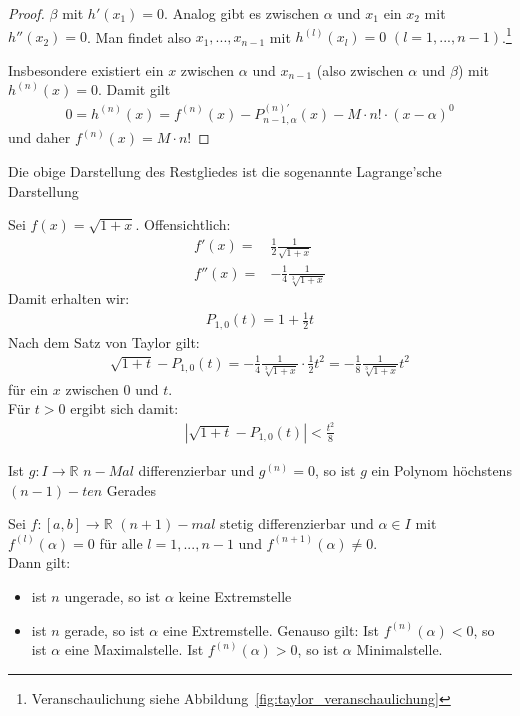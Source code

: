 \begin{proof}
	$\beta$ mit $h'(x_1) = 0$. Analog gibt es zwischen $\alpha$ und 
	$x_1$ ein $x_2$ mit $h''(x_2) = 0$. Man findet also $x_1, ..., x_{n-1}$ mit 
	$h^{(l)}(x_l) = 0$ $( l = 1, ..., n-1)$.\footnote{Veranschaulichung siehe Abbildung~\ref{fig:taylor_veranschaulichung}}

	Insbesondere existiert ein $x$ 
	zwischen $\alpha$ und $x_{n-1}$ (also zwischen $\alpha$ und $\beta$) mit 
	$h^{(n)}(x) = 0$. Damit gilt 
	\begin{align*}
		0 = h^{(n)}(x) = f^{(n)}(x) - P^{(n)'}_{n-1, \alpha}(x) - M \cdot n! \cdot 
		(x-\alpha)^0
	\end{align*}{}
	und daher $f^{(n)}(x) = M \cdot n!$
\end{proof}	

\begin{Bemerkung}{
	Die obige Darstellung des Restgliedes ist die sogenannte 
	Lagrange'sche Darstellung
}\end{Bemerkung}


\begin{Beispiel}{
	Sei $f(x) = \sqrt{1 +x}$. Offensichtlich: 
	\begin{align*}
		f'(x) = & \frac{1}{2} \frac{1}{\sqrt{1+x}} \\
		f''(x) = & -\frac{1}{4} \frac{1}{\sqrt[3]{1+x}}
	\end{align*}
	Damit erhalten wir: 
	\begin{align*}
		P_{1,0}(t) = 1 + \frac{1}{2}t
	\end{align*}
	Nach dem Satz von Taylor gilt:
	\begin{align*}
		\sqrt{1 +t} - P_{1, 0}(t) = -\frac{1}{4} \frac{1}{\sqrt[3]{1+x}} \cdot
		 \frac{1}{2}t^2 = -\frac{1}{8}\frac{1}{\sqrt[3]{1+x}}t	^2
	\end{align*}
	für ein $x$ zwischen $0$ und $t$. \\
	Für $t > 0$ ergibt sich damit: 
	\begin{align*}
		\left\vert \sqrt{1 + t} - P_{1,0}(t)\right\vert < \frac{t^2}{8}
	\end{align*}
	
}\end{Beispiel}

\begin{Korollar}{
	Ist $g: I \rightarrow \mathbb{R}$ $n-Mal$ differenzierbar und 
	$g^{(n)} = 0$, so ist $g$ ein Polynom höchstens $(n-1)-ten$ Gerades
}\end{Korollar}

\begin{Korollar}{
	Sei $f: [a,b] \rightarrow \mathbb{R}$ $(n+1)-mal$ stetig differenzierbar 
	und $\alpha \in I$ mit $f^{(l)}(\alpha) = 0$ für alle $ l = 1, ..., n-1$ und 
	$f^{(n+1)}(\alpha) \neq 0$. \\
	Dann gilt:
	\begin{itemize}
		\item ist $n$ ungerade, so ist $\alpha$ keine Extremstelle
		\item ist $n$ gerade, so ist $\alpha$ eine Extremstelle.
			Genauso gilt: Ist $f^{(n)}(\alpha) < 0$, so ist 
			$\alpha$ eine Maximalstelle. Ist $f^{(n)}(\alpha)>0$, so ist 
			$\alpha$ Minimalstelle.
	\end{itemize}
}\end{Korollar}

